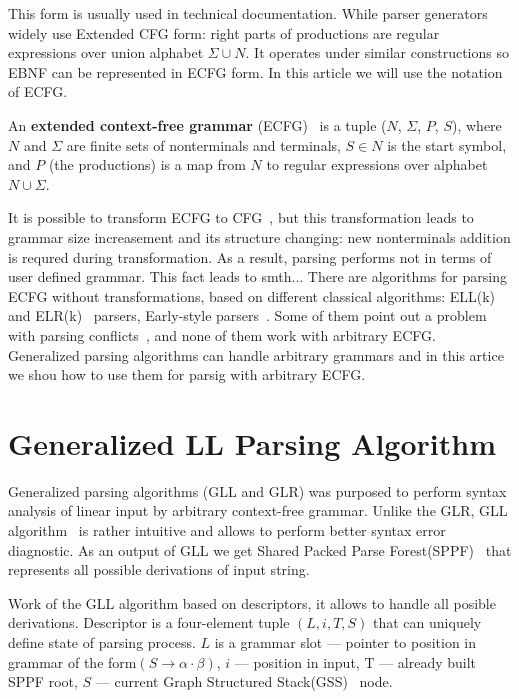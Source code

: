 \documentclass[runningheads,a4paper]{llncs}
\begin{document}
This form is usually used in technical documentation. While parser generators widely use Extended CFG form:
right parts of productions are regular expressions over union alphabet $\Sigma \cup N$. 
It operates under similar constructions so EBNF can be represented in ECFG form.
In this article we will use the notation of ECFG.

\begin{mydef}
An \textbf{extended context-free grammar} (ECFG)~\cite{ECFG} is a tuple ($N$, $\Sigma$, $P$, $S$), where $N$
and $\Sigma$ are finite sets of nonterminals and terminals, $ S\in N$ is the start symbol,
and $P$ (the productions) is a map from $N$ to regular expressions over alphabet $N \cup \Sigma$.
\end{mydef}

It is possible to transform ECFG to CFG~\cite{ELL}, but this transformation leads to grammar size increasement and its structure changing: new nonterminals addition is requred during transformation.
As a result, parsing performs not in terms of user defined grammar.
This fact leads to smth... 
There are algorithms for parsing ECFG without transformations, based on different classical algorithms: ELL(k)~\cite{!!!} and ELR(k)~\cite{!!!} parsers, Early-style parsers~\cite{!!!}.
Some of them point out a problem with parsing conflicts~\cite{}, and none of them work with arbitrary ECFG.
Generalized parsing algorithms can handle arbitrary grammars and in this artice we shou how to use them for parsig with arbitrary ECFG.




\section{Generalized LL Parsing Algorithm}%

Generalized parsing algorithms (GLL and GLR) was purposed to perform syntax analysis of linear input by arbitrary context-free 
grammar. Unlike the GLR, GLL algorithm~\cite{scott2010gll} is rather intuitive and allows to perform better syntax error diagnostic.
As an output of GLL we get Shared Packed Parse Forest(SPPF)~\cite{scott2013gll} that represents all possible derivations of input string.

Work of the GLL algorithm based on descriptors, it allows to handle all posible derivations.
Descriptor is a four-element tuple $(L,i, T, S)$ that can uniquely define state of parsing process. 
$L$ is a grammar slot --- pointer to position in grammar of the form$(S \to \alpha \cdot \beta)$, $i$ --- position in input,
T --- already built SPPF root, $S$ --- current Graph Structured Stack(GSS)~\cite{GSS} node.
\end{document}
